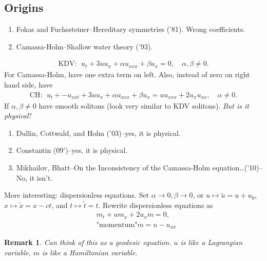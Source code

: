 \documentclass[12pt,reqno]{amsart}
\numberwithin{equation}{section}  %
\newtheorem{remark}[theorem]{Remark}
\begin{document}
\subsection{Origins}
\label{ssec:origins}
\begin{enumerate}
  \item
    Fokas and Fuchssteiner--Hereditary symmetries ('81). Wrong coefficients.
  \item Camassa-Holm--Shallow water theory ('93).
\end{enumerate}

\begin{equation*}
  \begin{split}
    \text{KDV}: \ \
    u_{t} + 3 uu_{x} + \alpha u_{xxx} + \beta u_{x} = 0, \quad \alpha,
    \beta \neq 0.
  \end{split}
\end{equation*}
For Camassa-Holm, have one extra term on left. Also,
instead of zero on right hand side, have
\begin{equation*}
  \begin{split}
    \text{CH}: \ \
    u_{t} + - u_{xxt} + 3 uu_{x} + \alpha u_{xxx} + \beta u_{x} = uu_{xxx} + 2
    u_{x} u_{xx}, \quad \alpha \neq 0.
  \end{split}
\end{equation*}
If $\alpha, \beta \neq 0$ have smooth solitons (look very similar to KDV
solitons). \emph{But is it physical}?
\begin{enumerate}
  \item Dullin, Cottwald, and Holm ('03)--yes, it is physical. 
  \item Constantin (09')--yes, it is physical.
  \item Mikhailov, Bhatt--On the Inconsistency of the Camassa-Holm
    equation\ldots('10)--No, it isn't.
\end{enumerate}
More interesting: dispersionless equations. Set $\alpha \to 0, \beta \to
0$, or $u \mapsto \tilde{u} = u + u_{0}$, $x \mapsto \tilde{x} = x -
ct$, and $t \mapsto \tilde{t} = t$. Rewrite dispersionless equations as
\begin{equation*}
  \begin{split}
    & m_{t} + um_{x} + 2 u_{x}m =0,
    \\
    & \text{"momentum"} m = u - u_{xx}
  \end{split}
\end{equation*}
\begin{remark}
  Can think of this as a geodesic equation. $u$ is like a Lagrangian
  variable, $m$ is like a Hamiltonian variable.
\end{remark}
\end{document}
